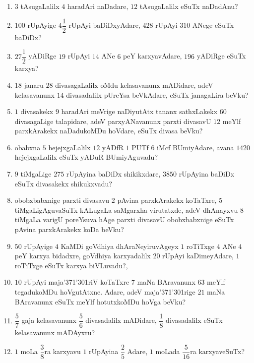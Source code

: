 \begin{enumerate}[\rm (1)]
\item $3$ tAsugaLalilx $4$ haradAri naDadare, $12$ tAsugaLalilx eSuTx naDadAnu?

\item $100$ rUpAyige $4\dfrac{1}{2}$ rUpAyi baDiDxyAdare, $428$ rUpAyi $310$ ANege eSuTx baDiDx?

\item $27\dfrac{1}{2}$ yADiRge $19$ rUpAyi $14$ ANe $6$ peY karxyavAdare, $196$ yADiRge eSuTx karxya?

\item $18$ janaru $28$ divasagaLalilx oMdu kelasavanunx mADidare, adeV kelasavanunx $14$ divasadalilx pUreYsa beVkAdare, eSuTx janagaLira beVku?

\item $1$ divasakekx $9$ haradAri meVrige naDiyutAtx tananx sathxLakekx $60$ divasagaLige talapidare, adeV parxyANavanunx parxti divasavU $12$ meYlf parxkArakekx naDadukoMDu hoVdare, eSuTx divasa beVku?

\item obabxna $5$ hejejxgaLalilx $12$ yADfR $1$ PUTf $6$ iMcf BUmiyAdare, avana $1420$ hejejxgaLalilx eSuTx yADuR BUmiyAguvadu?

\item $9$ tiMgaLige $275$ rUpAyina baDiDx shikikxdare, $3850$ rUpAyina baDiDx eSuTx divasakekx shikukxvadu?

\item obobxbabxnige parxti divasavu $2$ pAvina parxkArakekx koTaTxre, $5$ tiMgaLigAguvaSuTx kALugaLa saMgarxha virutatxde, adeV dhAnayxvu $8$ tiMgaLa varigU poreYsuva hAge parxti divasavU obobxbabxnige eSuTx pAvina parxkArakekx koDa beVku?

\item $50$ rUpAyige $4$ KaMDi goVdhiya dhAraNeyiruvAgeyx $1$ roTiTxge $4$ ANe $4$ peY karxya bidadxre, goVdhiya karxyadalilx $20$ rUpAyi kaDimeyAdare, $1$ roTiTxge eSuTx karxya biVLuvadu?,

\item $10$ rUpAyi maja\char'371\char'301riV koTaTxre $7$ maNa BAravanunx $63$ meYlf tegadukoMDu hoVgutAtxne. Adare, adeV maja\char'371\char'301rige $21$ maNa BAravanunx eSuTx meYlf hotutxkoMDu hoVga beVku?

\item $\dfrac{5}{7}$ gaja kelasavanunx $\dfrac{5}{6}$ divasadalilx mADidare, $\dfrac{1}{8}$ divasadalilx eSuTx kelasavanunx mADAyxru?

\item $1$ moLa $\dfrac{3}{8}$ra karxyavu $1$ rUpAyina $\dfrac{2}{5}$ Adare, $1$ moLada $\dfrac{5}{16}$ra karxyaveSuTx?


\end{enumerate}
